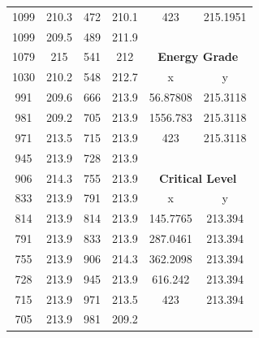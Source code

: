 \begin{center}
\begin{tabular}{|cc||cc||cc|}
    1099     & 210.3                    & 472  & 210.1                         & 423      & 215.1951                           \\
    1099     & 209.5                    & 489  & 211.9                         &          &                                    \\
    1079     & 215                      & 541  & 212                           & \multicolumn{2}{c|}{\textbf{Energy Grade}}    \\ 
    \cline{5-6}
    1030     & 210.2                    & 548  & 212.7                         & x        & y                                  \\
    991      & 209.6                    & 666  & 213.9                         & 56.87808 & 215.3118                           \\
    981      & 209.2                    & 705  & 213.9                         & 1556.783 & 215.3118                           \\
    971      & 213.5                    & 715  & 213.9                         & 423      & 215.3118                           \\
    945      & 213.9                    & 728  & 213.9                         &          &                                    \\
    906      & 214.3                    & 755  & 213.9                         & \multicolumn{2}{c|}{\textbf{Critical Level}}  \\ 
    \cline{5-6}
    833      & 213.9                    & 791  & 213.9                         & x        & y                                  \\
    814      & 213.9                    & 814  & 213.9                         & 145.7765 & 213.394                            \\
    791      & 213.9                    & 833  & 213.9                         & 287.0461 & 213.394                            \\
    755      & 213.9                    & 906  & 214.3                         & 362.2098 & 213.394                            \\
    728      & 213.9                    & 945  & 213.9                         & 616.242  & 213.394                            \\
    715      & 213.9                    & 971  & 213.5                         & 423      & 213.394                            \\
    705      & 213.9                    & 981  & 209.2                         &          &                                    \\

\end{tabular}
\end{center}
